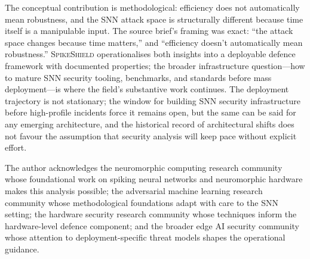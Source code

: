 \documentclass[sigconf,nonacm]{acmart}
\begin{document}
The conceptual contribution is methodological: efficiency does not
automatically mean robustness, and the SNN attack space is
structurally different because time itself is a manipulable input.
The source brief's framing was exact: ``the attack space changes
because time matters,'' and ``efficiency doesn't automatically
mean robustness.'' \textsc{SpikeShield} operationalises both
insights into a deployable defence framework with documented
properties; the broader infrastructure question---how to mature
SNN security tooling, benchmarks, and standards before mass
deployment---is where the field's substantive work continues. The
deployment trajectory is not stationary; the window for building
SNN security infrastructure before high-profile incidents force
it remains open, but the same can be said for any emerging
architecture, and the historical record of architectural shifts
does not favour the assumption that security analysis will keep
pace without explicit effort.

\begin{acks}
The author acknowledges the neuromorphic computing research
community whose foundational work on spiking neural networks and
neuromorphic hardware makes this analysis possible; the
adversarial machine learning research community whose
methodological foundations adapt with care to the SNN setting; the
hardware security research community whose techniques inform the
hardware-level defence component; and the broader edge AI
security community whose attention to deployment-specific threat
models shapes the operational guidance.
\end{acks}
\end{document}
